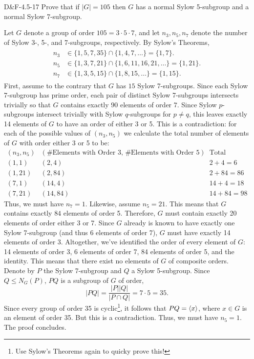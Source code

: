 \documentclass{article}
\begin{document}
	\begin{prb}{D\&F-4.5-17}
		Prove that if $|G| = 105$ then $G$ has a normal Sylow 5-subgroup and a normal Sylow 7-subgroup. 
	\end{prb}
	Let $G$ denote a group of order $105 = 3 \cdot 5 \cdot 7$, and let $n_{3}, n_{5}, n_{7}$ denote the number of Sylow 3-, 5-, and 7-subgroups, respectively. By Sylow's Theorems, 
	\begin{align*}
		\begin{split}
			n_{3} &\in \{1, 5, 7, 35\} \cap \{1, 4, 7, \ldots\} = \{1, 7\}. \\
			n_{5} &\in \{1, 3, 7, 21\} \cap \{1, 6, 11, 16, 21, \ldots\} = \{1, 21\}. \\
			n_{7} &\in \{1, 3, 5, 15\} \cap \{1, 8, 15, \ldots\} = \{1, 15\}. 
		\end{split}
	\end{align*}
	First, assume to the contrary that $G$ has $15$ Sylow 7-subgroups. Since each Sylow 7-subgroup has prime order, each pair of distinct Sylow 7-subgroups intersects trivially so that $G$ contains exactly $90$ elements of order $7$. Since Sylow $p$-subgroups intersect trivially with Sylow $q$-subgroups for $p \neq q$, this leaves exactly 14 elements of $G$ to have an order of either 3 or 5. This is a contradiction: for each of the possible values of $(n_{3}, n_{5})$ we calculate the total number of elements of $G$ with order either 3 or 5 to be: 
	\begin{equation*}
		\begin{array}{c|c|c}
			(n_{3}, n_{5}) & (\text{\# Elements with Order 3, \# Elements with Order 5})  & \text{Total} \\\hline \hline 
			(1,1) & (2,4) & 2 + 4 = 6 \\
			\hline (1,21) & (2, 84) & 2 + 84 = 86 \\
			\hline (7,1) & (14, 4) & 14 + 4 = 18 \\ 
			\hline (7, 21) & (14, 84) & 14 + 84 = 98
		\end{array}
	\end{equation*}
	Thus, we must have $n_{7} = 1$. Likewise, assume $n_{5} = 21$. This means that $G$ contains exactly $84$ elements of order 5. Therefore, $G$ must contain exactly 20 elements of order either 3 or 7. Since $G$ already is known to have exactly one Sylow 7-subgroup (and thus 6 elements of order 7), $G$ must have exactly 14 elements of order 3. Altogether, we've identified the order of every element of $G$: 14 elements of order 3, 6 elements of order 7, 84 elements of order 5, and the identity. This means that there exist no elements of $G$ of composite orders. Denote by $P$ the Sylow 7-subgroup and $Q$ a Sylow 5-subgroup. Since $Q \leq N_{G}(P)$, $PQ$ is a subgroup of $G$ of order, 
	\begin{equation*}
		|PQ| = \frac{|P||Q|}{|P \cap Q|} = 7 \cdot 5 = 35. 
	\end{equation*}
	Since every group of order 35 is cyclic\footnote{Use Sylow's Theorems again to quicky prove this!}, it follows that $PQ = \braket{x}$, where $x \in G$ is an element of order 35. But this is a contradiction. Thus, we must have $n_{5} = 1$. The proof concludes. 
	
\end{document}
